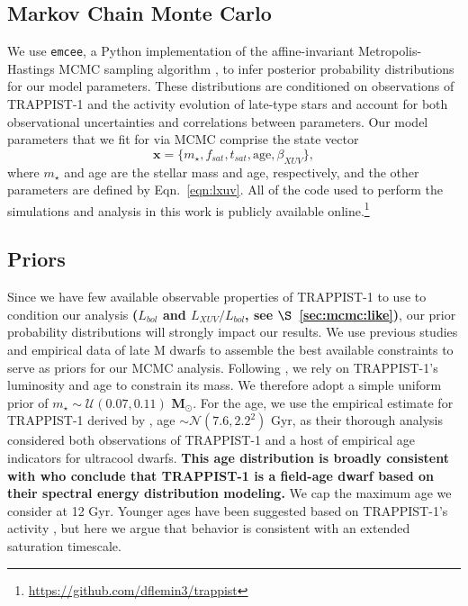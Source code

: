 \documentclass[twocolumn]{aastex62}
\def\gsim{~\rlap{$>$}{\lower 1.0ex\hbox{$\sim$}}}
\newcommand{\xxx}[1]{{\textbf{#1}}}
\begin{document}
\subsection{Markov Chain Monte Carlo} \label{sec:mcmc}

We use \texttt{emcee}, a Python implementation of the affine-invariant Metropolis-Hastings MCMC sampling algorithm \citep{ForemanMackey2013}, to infer posterior probability distributions for our model parameters. These distributions are conditioned on observations of TRAPPIST-1 and the activity evolution of late-type stars and account for both observational uncertainties and correlations between parameters. Our model parameters that we fit for via MCMC comprise the state vector
\begin{equation} \label{eqn:state}
    \textbf{x} = \{m_{\star}, f_{sat}, t_{sat}, \mathrm{age}, \beta_{XUV}\},
\end{equation}
where $m_{\star}$ and age are the stellar mass and age, respectively, and the other parameters are defined by Eqn.~\ref{eqn:lxuv}. All of the code used to perform the simulations and analysis in this work is publicly available online.\footnote{ \href{https://github.com/dflemin3/trappist}{https://github.com/dflemin3/trappist}}

\subsection{Priors} \label{sec:mcmc:priors}

Since we have few available observable properties of TRAPPIST-1 to use to condition our analysis \xxx{($L_{bol}$ and $L_{XUV}/L_{bol}$, see $\S$~\ref{sec:mcmc:like})}, our prior probability distributions will strongly impact our results. We use previous studies and empirical data of late M dwarfs to assemble the best available constraints to serve as priors for our MCMC analysis. Following \citet{vanGrootel2018}, we rely on TRAPPIST-1's luminosity and age to constrain its mass. We therefore adopt a simple uniform prior of $m_{\star} \sim \mathcal{U}(0.07, 0.11)$ \xxx{M$_{\odot}$}. For the age, we use the empirical estimate for TRAPPIST-1 derived by \citet{Burgasser2017}, age $\sim \mathcal{N}(7.6, 2.2^2)$ Gyr, as their thorough analysis considered both observations of TRAPPIST-1 and a host of empirical age indicators for ultracool dwarfs. \xxx{This age distribution is broadly consistent with \citet{Gonzales2019} who conclude that TRAPPIST-1 is a field-age dwarf based on their spectral energy distribution modeling.} We cap the maximum age we consider at 12 Gyr. Younger ages have been suggested based on TRAPPIST-1's activity \citep[e.g.~$\gsim 500$ Myr,][]{Bourrier2017b}, but here we argue that behavior is consistent with an extended saturation timescale.
\end{document}
